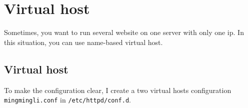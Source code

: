 
\chapter{Virtual host}

Sometimes, you want to run several website on one server with only one ip.
In this situation, you can use name-based virtual host.


\section{Virtual host}

To make the configuration clear, I create a two virtual hosts configuration \verb|mingmingli.conf| in \verb|/etc/httpd/conf.d|.








